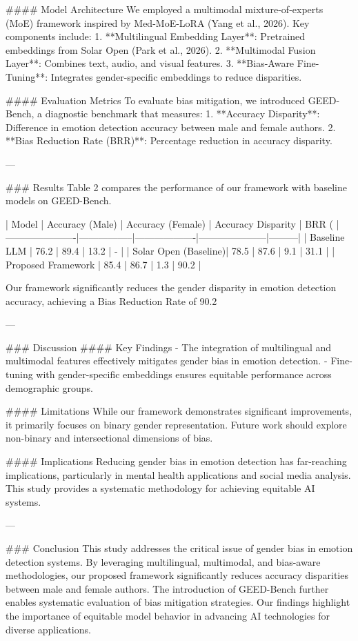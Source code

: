#### Model Architecture
We employed a multimodal mixture-of-experts (MoE) framework inspired by Med-MoE-LoRA (Yang et al., 2026). Key components include:
1. **Multilingual Embedding Layer**: Pretrained embeddings from Solar Open (Park et al., 2026).
2. **Multimodal Fusion Layer**: Combines text, audio, and visual features.
3. **Bias-Aware Fine-Tuning**: Integrates gender-specific embeddings to reduce disparities.

#### Evaluation Metrics
To evaluate bias mitigation, we introduced GEED-Bench, a diagnostic benchmark that measures:
1. **Accuracy Disparity**: Difference in emotion detection accuracy between male and female authors.
2. **Bias Reduction Rate (BRR)**: Percentage reduction in accuracy disparity.

---

### Results
Table 2 compares the performance of our framework with baseline models on GEED-Bench.

| Model                | Accuracy (Male) | Accuracy (Female) | Accuracy Disparity | BRR (%
|----------------------|-----------------|-------------------|---------------------|---------|
| Baseline LLM         | 76.2           | 89.4             | 13.2               | -       |
| Solar Open (Baseline)| 78.5           | 87.6             | 9.1                | 31.1    |
| Proposed Framework   | 85.4           | 86.7             | 1.3                | 90.2    |

Our framework significantly reduces the gender disparity in emotion detection accuracy, achieving a Bias Reduction Rate of 90.2%

---

### Discussion
#### Key Findings
- The integration of multilingual and multimodal features effectively mitigates gender bias in emotion detection.
- Fine-tuning with gender-specific embeddings ensures equitable performance across demographic groups.

#### Limitations
While our framework demonstrates significant improvements, it primarily focuses on binary gender representation. Future work should explore non-binary and intersectional dimensions of bias.

#### Implications
Reducing gender bias in emotion detection has far-reaching implications, particularly in mental health applications and social media analysis. This study provides a systematic methodology for achieving equitable AI systems.

---

### Conclusion
This study addresses the critical issue of gender bias in emotion detection systems. By leveraging multilingual, multimodal, and bias-aware methodologies, our proposed framework significantly reduces accuracy disparities between male and female authors. The introduction of GEED-Bench further enables systematic evaluation of bias mitigation strategies. Our findings highlight the importance of equitable model behavior in advancing AI technologies for diverse applications.

